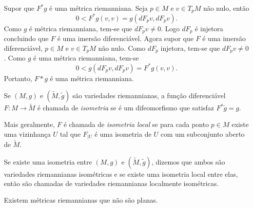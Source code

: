 \begin{demonstracao}
	Supor que $F^*g$ é uma métrica riemanniana. Seja $p \in M$ e $v \in T_pM$ não nulo, então
	\begin{equation*}
		0 < F^*g(v,v) = g(dF_p v, dF_p v).
	\end{equation*}
	Como $g$ é métrica riemanniana, tem-se que $dF_p v \neq 0$. Logo $dF_p$ é injetora concluindo que $F$ é uma imersão diferenciável.
	Agora supor que $F$ é uma imersão diferenciável, $p \in M$ e $v \in T_pM$ não nulo. Como $dF_p$ injetora, tem-se que $dF_p v \neq 0$. Como $g$ é uma métrica riemanniana, tem-se
	\begin{equation*}
		0 < g(dF_p v, dF_p v) = F^*g(v,v).
	\end{equation*}
	Portanto, $F* g$ é uma métrica riemanniana.
\end{demonstracao}

\begin{definicao}
	Se $(M,g)$ e $(\tilde{M}, \tilde{g})$ são variedades riemannianas, a função diferenciável $F: M \rightarrow \tilde{M}$ é chamada de \emph{isometria} se é um difeomorfismo que satisfaz $F^* \tilde{g} = g$.
\end{definicao}

\begin{observacao}
	Mais geralmente, $F$ é chamada de \emph{isometria local} se para cada ponto $p \in M$ existe uma vizinhança $U$ tal que $F_{|U}$ é uma isometria de $U$ com um subconjunto aberto de $\tilde{M}$.
\end{observacao}

\begin{observacao}
	Se existe uma isometria entre $(M,g)$ e $(\tilde{M}, \tilde{g})$, dizemos que ambos são variedades riemannianas isométricas e se existe uma isometria local entre elas, então são chamadas de variedades riemannianas localmente isométricas.
\end{observacao}


\begin{observacao}
	Existem métricas riemannianas que não são planas.
\end{observacao}



